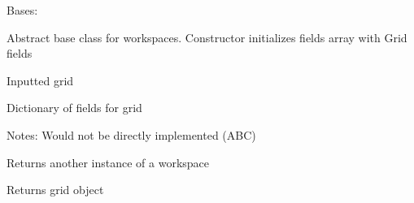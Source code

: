 \documentclass[letterpaper,10pt,english]{sphinxmanual}
\begin{document}
\begin{fulllineitems}
\label{\detokenize{autoapi/Workspace/index:Workspace.Workspace}}
\sphinxAtStartPar
Bases: 

\sphinxAtStartPar
Abstract base class for workspaces.
Constructor initializes fields array with Grid fields

\begin{fulllineitems}
\label{\detokenize{autoapi/Workspace/index:Workspace.Workspace.self.grid}}
\sphinxAtStartPar
Inputted grid

\end{fulllineitems}


\begin{fulllineitems}
\label{\detokenize{autoapi/Workspace/index:Workspace.Workspace.self.flds}}
\sphinxAtStartPar
Dictionary of fields for grid

\end{fulllineitems}


\sphinxAtStartPar
Notes: Would not be directly implemented (ABC)

\begin{fulllineitems}
\label{\detokenize{autoapi/Workspace/index:Workspace.Workspace.make_new}}
\sphinxAtStartPar
Returns another instance of a workspace

\end{fulllineitems}


\begin{fulllineitems}
\label{\detokenize{autoapi/Workspace/index:Workspace.Workspace.get_grid}}
\sphinxAtStartPar
Returns grid object


\end{fulllineitems}
\end{fulllineitems}
\end{document}
